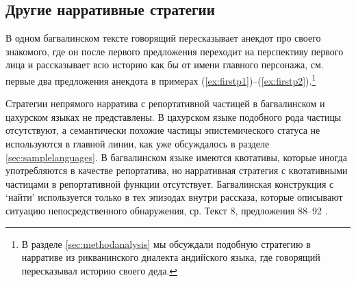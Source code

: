 \subsection{Другие нарративные стратегии} \label{sec:resultsotherstrat}

В одном багвалинском тексте говорящий пересказывает анекдот про своего знакомого, где он после первого предложения переходит на перспективу первого лица и рассказывает всю историю как бы от имени главного персонажа, см. первые два предложения анекдота в примерах (\ref{ex:firstp1})--(\ref{ex:firstp2}).\footnote{В разделе \ref{sec:methodanalysis} мы обсуждали подобную стратегию в нарративе из рикванинского диалекта андийского языка, где говорящий пересказывал историю своего деда.}



Стратегии непрямого нарратива с репортативной частицей в багвалинском и цахурском языках не представлены. В цахурском языке подобного рода частицы отсутствуют, а семантически похожие частицы эпистемического статуса не используются в главной линии, как уже обсуждалось в разделе \ref{sec:samplelanguages}. В багвалинском языке имеются квотативы, которые иногда употребляются в качестве репортатива, но нарративная стратегия с квотативными частицами в репортативной функции отсутствует. Багвалинская конструкция с `найти' используется только в тех эпизодах внутри рассказа, которые описывают ситуацию непосредственного обнаружения, ср. Текст 8, предложения 88--92 \citep[771]{bagvalalgram}.


